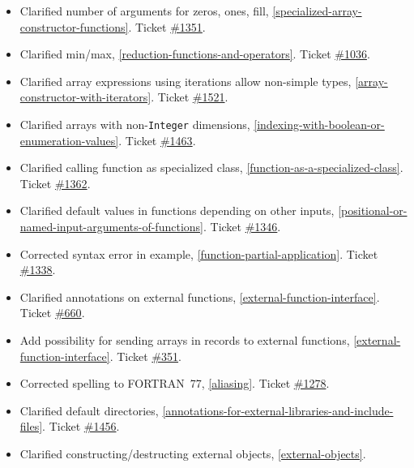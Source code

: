 \begin{itemize}
\item
  Clarified number of arguments for zeros, ones, fill, \cref{specialized-array-constructor-functions}.
  Ticket \href{https://github.com/modelica/ModelicaSpecification/issues/1351}{\#1351}.
\item
  Clarified min/max, \cref{reduction-functions-and-operators}. Ticket
  \href{https://github.com/modelica/ModelicaSpecification/issues/1036}{\#1036}.
\item
  Clarified array expressions using iterations allow non-simple types,
  \cref{array-constructor-with-iterators}. Ticket
  \href{https://github.com/modelica/ModelicaSpecification/issues/1521}{\#1521}.
\item
  Clarified arrays with non-\lstinline!Integer! dimensions, \cref{indexing-with-boolean-or-enumeration-values}.
  Ticket \href{https://github.com/modelica/ModelicaSpecification/issues/1463}{\#1463}.
\item
  Clarified calling function as specialized class, \cref{function-as-a-specialized-class}. Ticket
  \href{https://github.com/modelica/ModelicaSpecification/issues/1362}{\#1362}.
\item
  Clarified default values in functions depending on other inputs,
  \cref{positional-or-named-input-arguments-of-functions}. Ticket
  \href{https://github.com/modelica/ModelicaSpecification/issues/1346}{\#1346}.
\item
  Corrected syntax error in example, \cref{function-partial-application}. Ticket
  \href{https://github.com/modelica/ModelicaSpecification/issues/1338}{\#1338}.
\item
  Clarified annotations on external functions, \cref{external-function-interface}. Ticket
  \href{https://github.com/modelica/ModelicaSpecification/issues/660}{\#660}.
\item
  Add possibility for sending arrays in records to external functions,
  \cref{external-function-interface}. Ticket
  \href{https://github.com/modelica/ModelicaSpecification/issues/351}{\#351}.
\item
  Corrected spelling to FORTRAN~77, \cref{aliasing}. Ticket
  \href{https://github.com/modelica/ModelicaSpecification/issues/1278}{\#1278}.
\item
  Clarified default directories, \cref{annotations-for-external-libraries-and-include-files}. Ticket
  \href{https://github.com/modelica/ModelicaSpecification/issues/1456}{\#1456}.
\item
  Clarified constructing/destructing external objects, \cref{external-objects}.

\end{itemize}
